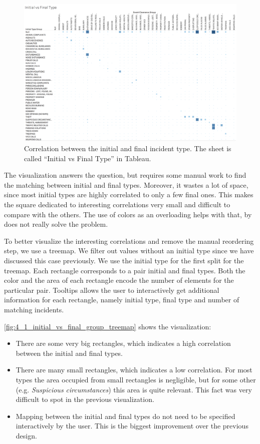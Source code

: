 \begin{figure}[h]
	\centering
	\includegraphics[width=\columnwidth]{figures/4_1_initial_vs_final_group_heatmap}
	\caption{Correlation between the initial and final incident type. The sheet is called ``Initial vs Final Type'' in Tableau.}
	\label{fig:4_1_initial_vs_final_group_heatmap}
\end{figure}

The visualization answers the question, but requires some manual work to find the matching between initial and final types.
Moreover, it wastes a lot of space, since most initial types are highly correlated to only a few final ones.
This makes the square dedicated to interesting correlations very small and difficult to compare with the others.
The use of colors as an overloading helps with that, by does not really solve the problem. 

To better visualize the interesting correlations and remove the manual reordering step, we use a treemap.
We filter out values without an initial type since we have discussed this case previously.
We use the initial type for the first split for the treemap.
Each rectangle corresponds to a pair initial and final types.
Both the color and the area of each rectangle encode the number of elements for the particular pair.
Tooltips allows the user to interactively get additional information for each rectangle, namely initial type, final type and number of matching incidents.

\cref{fig:4_1_initial_vs_final_group_treemap} shows the visualization:
\begin{itemize}
	\item There are some very big rectangles, which indicates a high correlation between the initial and final types.
	\item There are many small rectangles, which indicates a low correlation. For most types the area occupied from small rectangles is negligible, but for some other (e.g. \textit{Suspicious circumstances}) this area is quite relevant. This fact was very difficult to spot in the previous visualization.
	\item Mapping between the initial and final types do not need to be specified interactively by the user. This is the biggest improvement over the previous design.
\end{itemize}

